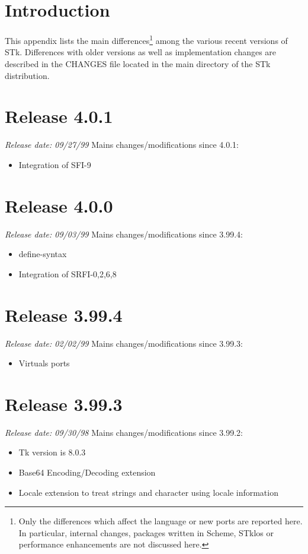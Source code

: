 %
%
%

\section*{Introduction}

This appendix lists the main differences\footnote{ Only the
  differences which affect the language or new ports are reported
  here.  In particular, internal changes, packages written in Scheme,
  STklos or performance enhancements are not discussed here.} among
the various recent versions of STk.  Differences with older versions
as well as implementation changes are described in the CHANGES file
located in the main directory of the STk distribution.

\section*{Release 4.0.1}
\small{\emph{Release date: 09/27/99}}
Mains changes/modifications since 4.0.1:
\begin{itemize}
\item Integration of SFI-9
\end{itemize}

\section*{Release 4.0.0}
\small{\emph{Release date: 09/03/99}}
Mains changes/modifications since 3.99.4:
\begin{itemize}
\item define-syntax
\item Integration of SRFI-{0,2,6,8}
\end{itemize}

\section*{Release 3.99.4}
\small{\emph{Release date: 02/02/99}}
Mains changes/modifications since 3.99.3:
\begin{itemize}
\item  Virtuals ports
\end{itemize}

\section*{Release 3.99.3}
\small{\emph{Release date: 09/30/98}}
Mains changes/modifications since 3.99.2:
\begin{itemize}
\item  Tk version is 8.0.3
  
\item Base64 Encoding/Decoding extension
  
\item Locale extension to treat strings and character using locale
  information
\end{itemize}

